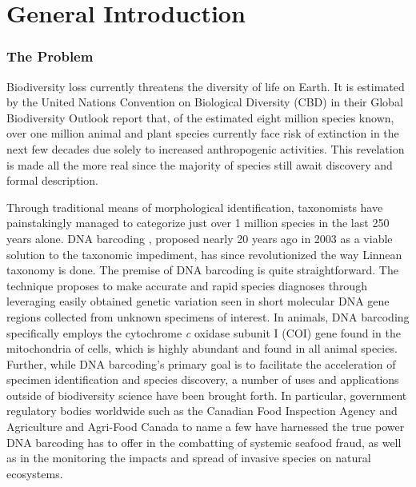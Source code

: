 \linespread{1.0}

\chapter{General Introduction}

\subsection{The Problem}

Biodiversity loss currently threatens the diversity of life on Earth. It is estimated by the United Nations Convention on Biological Diversity (CBD) in their Global Biodiversity Outlook report that, of the estimated eight million species known, over one million animal and plant species currently face risk of extinction in the next few decades due solely to increased anthropogenic activities. This revelation is made all the more real since the majority of species still await discovery and formal description. 

\vspace{5mm}

Through traditional means of morphological identification, taxonomists have \\ painstakingly managed to categorize just over 1 million species in the last 250 years alone. DNA barcoding \cite{hebert2003biological, hebert2003barcoding}, proposed nearly 20 years ago in 2003 as a viable solution to the taxonomic impediment, has since revolutionized the way Linnean taxonomy is done. The premise of DNA barcoding is quite straightforward. The technique proposes to make accurate and rapid species diagnoses through leveraging easily obtained genetic variation seen in short molecular DNA gene regions collected from unknown specimens of interest. In animals, DNA barcoding specifically employs the cytochrome \textit{c} oxidase subunit I (COI) gene found in the mitochondria of cells, which is highly abundant and found in all animal species. Further, while DNA barcoding's primary goal is to facilitate the acceleration of specimen identification and species discovery, a number of uses and applications outside of biodiversity science have been brought forth. In particular, government regulatory bodies worldwide such as the Canadian Food Inspection Agency and Agriculture and Agri-Food Canada to name a few have harnessed the true power DNA barcoding has to offer in the combatting of systemic seafood fraud, as well as in the monitoring the impacts and spread of invasive species on natural ecosystems.

